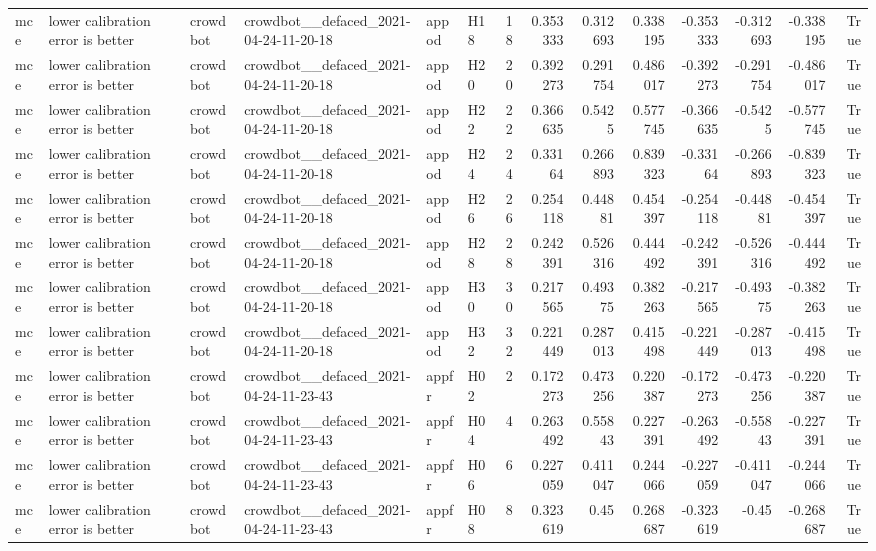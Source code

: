 \begin{longtable}{llllllrrrrrrrr}
mce & lower calibration error is better & crowdbot & crowdbot\_\_defaced\_2021-04-24-11-20-18 & appod & H18 & 18 & 0.353333 & 0.312693 & 0.338195 & -0.353333 & -0.312693 & -0.338195 & True \\
mce & lower calibration error is better & crowdbot & crowdbot\_\_defaced\_2021-04-24-11-20-18 & appod & H20 & 20 & 0.392273 & 0.291754 & 0.486017 & -0.392273 & -0.291754 & -0.486017 & True \\
mce & lower calibration error is better & crowdbot & crowdbot\_\_defaced\_2021-04-24-11-20-18 & appod & H22 & 22 & 0.366635 & 0.5425 & 0.577745 & -0.366635 & -0.5425 & -0.577745 & True \\
mce & lower calibration error is better & crowdbot & crowdbot\_\_defaced\_2021-04-24-11-20-18 & appod & H24 & 24 & 0.33164 & 0.266893 & 0.839323 & -0.33164 & -0.266893 & -0.839323 & True \\
mce & lower calibration error is better & crowdbot & crowdbot\_\_defaced\_2021-04-24-11-20-18 & appod & H26 & 26 & 0.254118 & 0.44881 & 0.454397 & -0.254118 & -0.44881 & -0.454397 & True \\
mce & lower calibration error is better & crowdbot & crowdbot\_\_defaced\_2021-04-24-11-20-18 & appod & H28 & 28 & 0.242391 & 0.526316 & 0.444492 & -0.242391 & -0.526316 & -0.444492 & True \\
mce & lower calibration error is better & crowdbot & crowdbot\_\_defaced\_2021-04-24-11-20-18 & appod & H30 & 30 & 0.217565 & 0.49375 & 0.382263 & -0.217565 & -0.49375 & -0.382263 & True \\
mce & lower calibration error is better & crowdbot & crowdbot\_\_defaced\_2021-04-24-11-20-18 & appod & H32 & 32 & 0.221449 & 0.287013 & 0.415498 & -0.221449 & -0.287013 & -0.415498 & True \\
mce & lower calibration error is better & crowdbot & crowdbot\_\_defaced\_2021-04-24-11-23-43 & appfr & H02 & 2 & 0.172273 & 0.473256 & 0.220387 & -0.172273 & -0.473256 & -0.220387 & True \\
mce & lower calibration error is better & crowdbot & crowdbot\_\_defaced\_2021-04-24-11-23-43 & appfr & H04 & 4 & 0.263492 & 0.55843 & 0.227391 & -0.263492 & -0.55843 & -0.227391 & True \\
mce & lower calibration error is better & crowdbot & crowdbot\_\_defaced\_2021-04-24-11-23-43 & appfr & H06 & 6 & 0.227059 & 0.411047 & 0.244066 & -0.227059 & -0.411047 & -0.244066 & True \\
mce & lower calibration error is better & crowdbot & crowdbot\_\_defaced\_2021-04-24-11-23-43 & appfr & H08 & 8 & 0.323619 & 0.45 & 0.268687 & -0.323619 & -0.45 & -0.268687 & True \\

\end{longtable}
